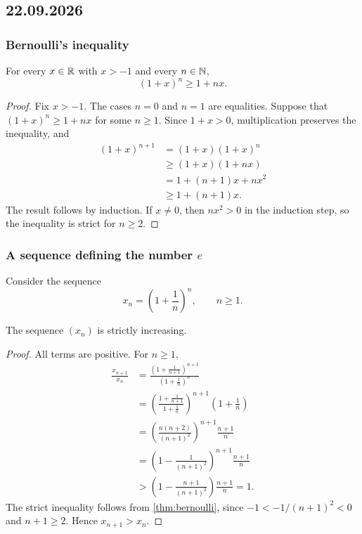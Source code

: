 \documentclass[11pt,a4paper]{amsart}
\begin{document}
\subsection{22.09.2026}

\subsubsection{Bernoulli's inequality}

\begin{theorem}\label{thm:bernoulli}
  For every \(x\in\mathbb{R}\) with \(x>-1\) and every \(n\in\mathbb{N}\),
  \[
    (1+x)^n\geq1+nx.
  \]
\end{theorem}

\begin{proof}
  Fix \(x>-1\). The cases \(n=0\) and \(n=1\) are equalities.
  Suppose that \((1+x)^n\geq1+nx\) for some \(n\geq1\).
  Since \(1+x>0\), multiplication preserves the inequality, and
  \begin{align*}
    (1+x)^{n+1}
    &=(1+x)(1+x)^n\\
    &\geq(1+x)(1+nx)\\
    &=1+(n+1)x+nx^2\\
    &\geq1+(n+1)x.
  \end{align*}
  The result follows by induction. If \(x\neq0\), then \(nx^2>0\)
  in the induction step, so the inequality is strict for \(n\geq2\).
\end{proof}

\subsubsection{A sequence defining the number \texorpdfstring{\(e\)}{e}}

Consider the sequence
\[
  x_n=\left(1+\frac{1}{n}\right)^n,\qquad n\geq1.
\]

\begin{lemma}
  The sequence \((x_n)\) is strictly increasing.
\end{lemma}

\begin{proof}
  All terms are positive. For \(n\geq1\),
  \begin{align*}
    \frac{x_{n+1}}{x_n}
    &=\frac{\left(1+\frac{1}{n+1}\right)^{n+1}}
    {\left(1+\frac{1}{n}\right)^n}\\
    &=\left(\frac{1+\frac{1}{n+1}}{1+\frac{1}{n}}\right)^{n+1}
    \left(1+\frac{1}{n}\right)\\
    &=\left(\frac{n(n+2)}{(n+1)^2}\right)^{n+1}
    \frac{n+1}{n}\\
    &=\left(1-\frac{1}{(n+1)^2}\right)^{n+1}\frac{n+1}{n}\\
    &>\left(1-\frac{n+1}{(n+1)^2}\right)\frac{n+1}{n}
    =1.
  \end{align*}
  The strict inequality follows from \cref{thm:bernoulli}, since
  \(-1<-1/(n+1)^2<0\) and \(n+1\geq2\).
  Hence \(x_{n+1}>x_n\).
\end{proof}
\end{document}
